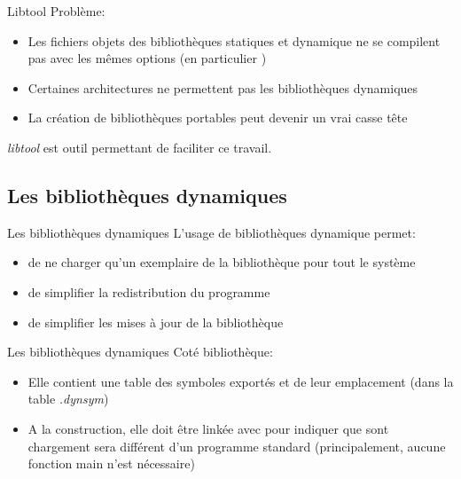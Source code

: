 \begin{frame}[fragile=singleslide]{Libtool}
  Problème:
  \begin{itemize}
  \item Les  fichiers objets des bibliothèques  statiques et dynamique
    ne  se  compilent  pas  avec  les mêmes  options  (en  particulier
    )
  \item  Certaines architectures ne  permettent pas  les bibliothèques
    dynamiques
  \item La  création de bibliothèques  portables peut devenir  un vrai
    casse tête
  \end{itemize}
  \emph{libtool} est outil permettant de faciliter ce travail.
\end{frame}

\subsection{Les bibliothèques dynamiques}

\begin{frame}[fragile=singleslide]{Les bibliothèques dynamiques}
  L'usage de bibliothèques dynamique permet:
  \begin{itemize}
  \item de ne charger qu'un exemplaire de la bibliothèque pour tout le
    système
  \item de simplifier la redistribution du programme
  \item de simplifier les mises à jour de la bibliothèque
  \end{itemize}
\end{frame}

\begin{frame}[fragile=singleslide]{Les bibliothèques dynamiques}
  Coté bibliothèque:
  \begin{itemize}
  \item  Elle contient  une table  des  symboles exportés  et de  leur
    emplacement (dans la table \emph{.dynsym})
  \item A  la construction, elle  doit être linkée  avec 
    pour indiquer  que sont  chargement sera différent  d'un programme
    standard (principalement, aucune fonction main n'est nécessaire)
  \end{itemize}
\end{frame}

